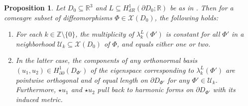 \documentclass[11pt,reqno]{amsart}
\newtheorem{proposition}{Proposition}[section]
\begin{document}
\begin{proposition}
\label{theorem:curl_multiplicity}
Let $D_0 \subseteq \mathbb R^3$ and $L \subseteq H^1_{dR}(\partial D_0; \mathbb R)$ be as in . Then for a comeagre subset of diffeomorphisms $\Phi \in \mathcal X(D_0)$, the following holds:
\begin{enumerate}
    \item For each $k \in \mathbb Z \setminus\{0\}$, the multiplicity of $\lambda_k^L(\Phi')$ is constant for all $\Phi'$ in a neighborhood $\mathcal U_k \subseteq \mathcal X(D_0)$ of $\Phi$, and equals either one or two.
    \item In the latter case, the components of any orthonormal basis $(u_1,u_2) \in H^1_{\partial\partial}(D_{\Phi'})$ of the eigenspace corresponding to $\lambda_k^L(\Phi')$ are pointwise orthogonal and of equal length on $\partial D_{\Phi'}$ for any $\Phi' \in \mathcal U_k$. Furthermore, $\star u_1$ and $\star u_2$ pull back to harmonic forms on $\partial D_{\Phi'}$ with its induced metric.
\end{enumerate}
\end{proposition}
\end{document}
